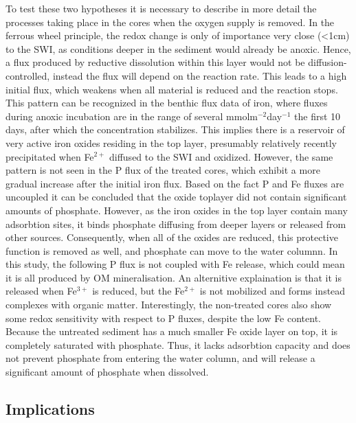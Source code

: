 \documentclass[a4paper,11pt]{article}
\begin{document}
To test these two hypotheses it is necessary to describe in more detail the processes taking place in the cores when the oxygen supply is removed. In the ferrous wheel principle, the redox change is only of importance very close (\textless1cm) to the SWI, as conditions deeper in the sediment would already be anoxic. Hence, a flux produced by reductive dissolution within this layer would not be diffusion-controlled, instead the flux will depend on the reaction rate. This leads to a high initial flux, which weakens when all material is reduced and the reaction stops. This pattern can be recognized in the benthic flux data of iron, where fluxes during anoxic incubation are in the range of several mmolm\(^{-2}\)day\(^{-1}\) the first 10 days, after which the concentration stabilizes. This implies there is a reservoir of very active iron oxides residing in the top layer, presumably relatively recently precipitated when Fe\(^{2+}\) diffused to the SWI and oxidized. However, the same pattern is not seen in the P flux of the treated cores, which exhibit a more gradual increase after the initial iron flux. Based on the fact P and Fe fluxes are uncoupled it can be concluded that the oxide toplayer did not contain significant amounts of phosphate. However, as the iron oxides in the top layer contain many adsorbtion sites, it binds phosphate diffusing from deeper layers or released from other sources. Consequently, when all of the oxides are reduced, this protective function is removed as well, and phosphate can move to the water columnn. In this study, the following P flux is not coupled with Fe release, which could mean it is all produced by OM mineralisation. An alternitive explaination is that it is released when Fe\(^{3+}\) is reduced, but the Fe\(^{2+}\) is not mobilized and forms instead complexes with organic matter. Interestingly, the non-treated cores also show some redox sensitivity with respect to P fluxes, despite the low Fe content. Because the untreated sediment has a much smaller Fe oxide layer on top, it is completely saturated with phosphate. Thus, it lacks adsorbtion capacity and does not prevent phosphate from entering the water column, and will release a significant amount of phosphate when dissolved.

\hypertarget{implications}{%
\subsection{Implications}\label{implications}}
\end{document}
